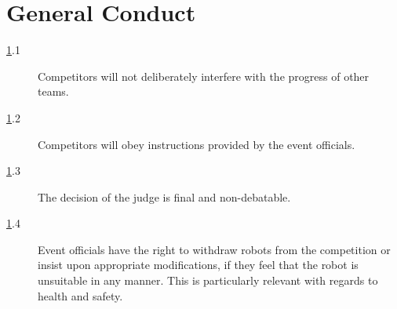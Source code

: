 \section {General Conduct}
\label{gencon}

\begin {description}
\item [\ref{gencon}.1] Competitors will not deliberately interfere with the progress of other teams.
\item [\ref{gencon}.2] Competitors will obey instructions provided by the event officials.
\item [\ref{gencon}.3] The decision of the judge is final and non-debatable. 
\item [\ref{gencon}.4] Event officials have the right to withdraw robots from the competition or insist upon appropriate modifications, if they feel that the robot is unsuitable in any manner. This is particularly relevant with regards to health and safety.
\end {description}
